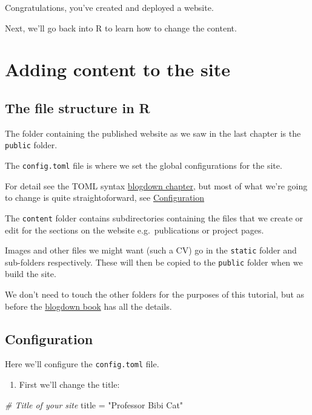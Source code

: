 \documentclass[12pt,]{book}
\newenvironment{Shaded}{\begin{snugshade}}{\end{snugshade}}
\newcommand{\StringTok}[1]{\textcolor[rgb]{0.31,0.60,0.02}{#1}}
\newcommand{\CommentTok}[1]{\textcolor[rgb]{0.56,0.35,0.01}{\textit{#1}}}
\newcommand{\NormalTok}[1]{#1}
\providecommand{\tightlist}{%
  \setlength{\itemsep}{0pt}\setlength{\parskip}{0pt}}
\theoremstyle{definition}
\theoremstyle{definition}
\theoremstyle{definition}
\theoremstyle{remark}
\begin{document}
Congratulations, you've created and deployed a website.

Next, we'll go back into R to learn how to change the content.

\chapter{Adding content to the site}\label{adding-content-to-the-site}

\section{The file structure in R}\label{the-file-structure-in-r}

The folder containing the published website as we saw in the last
chapter is the \texttt{public} folder.

The \texttt{config.toml} file is where we set the global configurations
for the site.

For detail see the TOML syntax
\href{https://bookdown.org/yihui/blogdown/configuration.html}{blogdown
chapter}, but most of what we're going to change is quite
straightoforward, see \protect\hyperlink{configuration}{Configuration}

The \texttt{content} folder contains subdirectories containing the files
that we create or edit for the sections on the website e.g.~publications
or project pages.

Images and other files we might want (such a CV) go in the
\texttt{static} folder and sub-folders respectively. These will then be
copied to the \texttt{public} folder when we build the site.

We don't need to touch the other folders for the purposes of this
tutorial, but as before the
\href{https://bookdown.org/yihui/blogdown}{blogdown book} has all the
details.

\hypertarget{configuration}{\section{Configuration}\label{configuration}}

Here we'll configure the \texttt{config.toml} file.

\begin{enumerate}
\def\labelenumi{\arabic{enumi}.}
\tightlist
\item
  First we'll change the title:
\end{enumerate}

\begin{Shaded}
\begin{Highlighting}[]
\CommentTok{# Title of your site}
\NormalTok{title =}\StringTok{ "Professor Bibi Cat"}
\end{Highlighting}
\end{Shaded}
\end{document}

